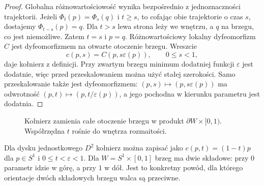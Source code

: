 \begin{proof}
Globalna różnowartościowość wynika bezpośrednio
z jednoznaczności trajektorii. Jeżeli
$\Phi_t(p)=\Phi_s(q)$ i $t\geq s$, to cofając
obie trajektorie o czas $s$, dostajemy
$\Phi_{t-s}(p)=q$. Dla $t>s$ lewa strona
leży we wnętrzu, a $q$ na brzegu, co jest
niemożliwe. Zatem $t=s$ i $p=q$.
Różnowartościowy lokalny dyfeomorfizm $C$ jest
dyfeomorfizmem na otwarte otoczenie brzegu.
Wreszcie
\[
 c(p,s)=C(p,s\varepsilon(p)),\qquad 0\leq s<1,
\]
daje kołnierz z definicji. Przy zwartym brzegu
minimum dodatniej funkcji $\varepsilon$ jest dodatnie,
więc przed przeskalowaniem można użyć stałej szerokości.
Samo przeskalowanie także jest dyfeomorfizmem:
$(p,s)\mapsto(p,s\varepsilon(p))$ ma odwrotność
$(p,t)\mapsto(p,t/\varepsilon(p))$, a jego pochodna
w kierunku parametru jest dodatnia.
\end{proof}

\begin{figure}[H]
\centering
{}
\caption{Kołnierz zamienia całe otoczenie brzegu
w produkt $\partial W\times[0,1)$.
Współrzędna $t$ rośnie do wnętrza rozmaitości.}
\label{fig:kolnierz-15}
\end{figure}

\begin{przyklad}
Dla dysku jednostkowego $D^2$
kołnierz można zapisać jako
$c(p,t)=(1-t)p$ dla $p\in S^1$
i $0\leq t<\varepsilon<1$.
Dla $W=S^1\times[0,1]$ brzeg
ma dwie składowe: przy $0$
parametr idzie w górę, a przy
$1$ w dół. Jest to konkretny
powód, dla którego orientacje
dwóch składowych brzegu walca
są przeciwne.
\end{przyklad}

